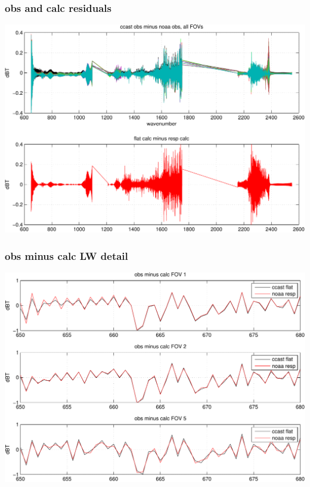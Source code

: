 \documentclass[11pt]{beamer}
\begin{document}
\begin{frame}
\frametitle{obs and calc residuals}
\begin{center}
  \includegraphics[scale=0.5]{figures/obs_calc_diffs.pdf}
\end{center}
\end{frame}
\begin{frame}
\frametitle{obs minus calc LW detail}
\begin{center}
  \includegraphics[scale=0.5]{figures/cal_LW_detail.pdf}
\end{center}
\end{frame}
\end{document}
